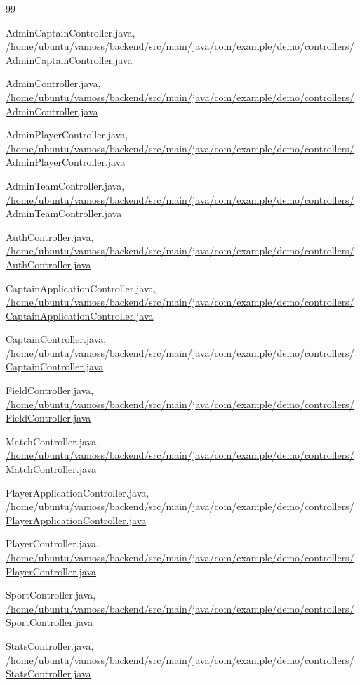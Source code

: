 \documentclass{article}
\begin{document}
\begin{thebibliography}{99}

AdminCaptainController.java, \url{/home/ubuntu/vamoss/backend/src/main/java/com/example/demo/controllers/AdminCaptainController.java}

AdminController.java, \url{/home/ubuntu/vamoss/backend/src/main/java/com/example/demo/controllers/AdminController.java}

AdminPlayerController.java, \url{/home/ubuntu/vamoss/backend/src/main/java/com/example/demo/controllers/AdminPlayerController.java}

AdminTeamController.java, \url{/home/ubuntu/vamoss/backend/src/main/java/com/example/demo/controllers/AdminTeamController.java}

AuthController.java, \url{/home/ubuntu/vamoss/backend/src/main/java/com/example/demo/controllers/AuthController.java}

CaptainApplicationController.java, \url{/home/ubuntu/vamoss/backend/src/main/java/com/example/demo/controllers/CaptainApplicationController.java}

CaptainController.java, \url{/home/ubuntu/vamoss/backend/src/main/java/com/example/demo/controllers/CaptainController.java}

FieldController.java, \url{/home/ubuntu/vamoss/backend/src/main/java/com/example/demo/controllers/FieldController.java}

MatchController.java, \url{/home/ubuntu/vamoss/backend/src/main/java/com/example/demo/controllers/MatchController.java}

PlayerApplicationController.java, \url{/home/ubuntu/vamoss/backend/src/main/java/com/example/demo/controllers/PlayerApplicationController.java}

PlayerController.java, \url{/home/ubuntu/vamoss/backend/src/main/java/com/example/demo/controllers/PlayerController.java}

SportController.java, \url{/home/ubuntu/vamoss/backend/src/main/java/com/example/demo/controllers/SportController.java}

StatsController.java, \url{/home/ubuntu/vamoss/backend/src/main/java/com/example/demo/controllers/StatsController.java}


\end{thebibliography}
\end{document}
